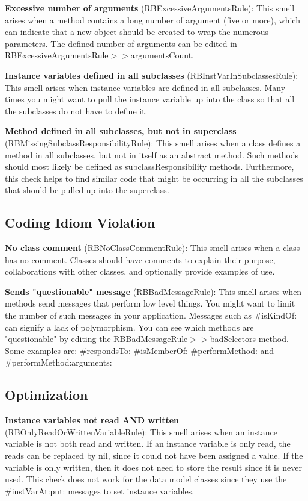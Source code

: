 \textbf{Excessive number of arguments} (RBExcessiveArgumentsRule): This smell arises when a method contains a long number of argument (five or more), which can indicate that a new object should be created to wrap the numerous parameters. The defined number of arguments can be edited in RBExcessiveArgumentsRule$>>$argumentsCount.

\textbf{Instance variables defined in all subclasses} (RBInstVarInSubclassesRule): This smell arises when instance variables are defined in all subclasses. Many times you might want to pull the instance variable up into the class so that all the subclasses do not have to define it.

\textbf{Method defined in all subclasses, but not in superclass} (RBMissingSubclassResponsibilityRule): This smell arises when a class defines a method in all subclasses, but not in itself as an abstract method. Such methods should most likely be defined as subclassResponsibility methods. Furthermore, this check helps to find similar code that might be occurring in all the subclasses that should be pulled up into the superclass.

\subsection{Coding Idiom Violation}
\textbf{No class comment} (RBNoClassCommentRule): This smell arises when a class has no comment. Classes should have comments to explain their purpose, collaborations with other classes, and optionally provide examples of use.

\textbf{Sends "questionable" message} (RBBadMessageRule): This smell arises when methods send messages that perform low level things. You might want to limit the number of such messages in your application. Messages such as \#isKindOf: can signify a lack of polymorphism. You can see which methods are "questionable" by editing the RBBadMessageRule$>>$badSelectors method. Some examples are: \#respondsTo: \#isMemberOf: \#performMethod: and \#performMethod:arguments:

\subsection{Optimization}
\textbf{Instance variables not read AND written} (RBOnlyReadOrWrittenVariableRule): This smell arises when an instance variable is not both read and written. If an instance variable is only read, the reads can be replaced by nil, since it could not have been assigned a value. If the variable is only written, then it does not need to store the result since it is never used. This check does not work for the data model classes since they use the \#instVarAt:put: messages to set instance variables.

